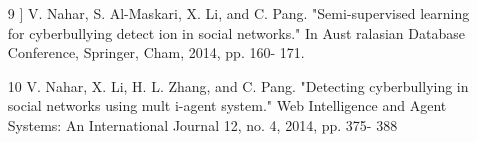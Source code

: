 \documentclass[oneside,a4paper,12pt]{report}
\begin{document}
\begin{itemize}
\item [9]] V. Nahar, S. Al-Maskari, X. Li, and C. Pang. "Semi-supervised learning
for cyberbullying detect ion in social networks." In Aust ralasian
Database Conference, Springer, Cham, 2014, pp. 160- 171.\\

\item [10]V. Nahar, X. Li, H. L. Zhang, and C. Pang. "Detecting cyberbullying in
social networks using mult i-agent system." Web Intelligence and Agent
Systems: An International Journal 12, no. 4, 2014, pp. 375- 388\\





\end{itemize}
\begin{appendices}

\end{appendices}
\end{document}
